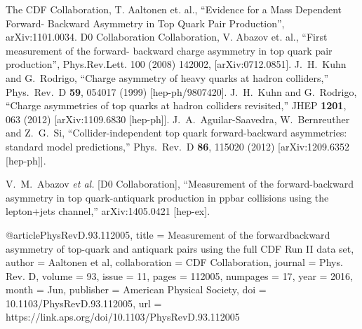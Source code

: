 \documentclass{cmspaperpdf}
\begin{document}
\clearpage

\newpage
\begin{thebibliography}{9}
  The CDF Collaboration, T. Aaltonen et. al., ``Evidence for a Mass Dependent Forward- Backward Asymmetry in Top Quark Pair Production'', arXiv:1101.0034.
   D0 Collaboration Collaboration, V. Abazov et. al., ``First measurement of the forward- backward charge asymmetry in top quark pair production'', Phys.Rev.Lett. 100 (2008) 142002, [arXiv:0712.0851].
  J.~H.~Kuhn and G.~Rodrigo,
  ``Charge asymmetry of heavy quarks at hadron colliders,''
  Phys.\ Rev.\ D {\bf 59}, 054017 (1999)
  [hep-ph/9807420].
  J.~H.~Kuhn and G.~Rodrigo,
  ``Charge asymmetries of top quarks at hadron colliders revisited,''
  JHEP {\bf 1201}, 063 (2012)
  [arXiv:1109.6830 [hep-ph]].
  J.~A.~Aguilar-Saavedra, W.~Bernreuther and Z.~G.~Si,
  ``Collider-independent top quark forward-backward asymmetries: standard model predictions,''
  Phys.\ Rev.\ D {\bf 86}, 115020 (2012)
  [arXiv:1209.6352 [hep-ph]].
  
  V.~M.~Abazov {\it et al.}  [D0 Collaboration],
  ``Measurement of the forward-backward asymmetry in top quark-antiquark production in ppbar collisions using the lepton+jets channel,''
  arXiv:1405.0421 [hep-ex].

@article{PhysRevD.93.112005,
  title = {Measurement of the forwardbackward asymmetry of top-quark and antiquark pairs using the full CDF Run II data set},
  author = {Aaltonen et al},
  collaboration = {CDF Collaboration},
  journal = {Phys. Rev. D},
  volume = {93},
  issue = {11},
  pages = {112005},
  numpages = {17},
  year = {2016},
  month = {Jun},
  publisher = {American Physical Society},
  doi = {10.1103/PhysRevD.93.112005},
  url = {https://link.aps.org/doi/10.1103/PhysRevD.93.112005}
}


\end{thebibliography}
\end{document}
